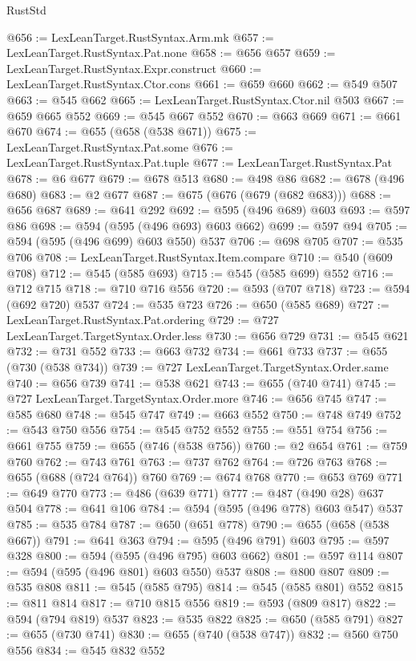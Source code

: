 \begin{lexlean}{RustStd}
\begin{coremodule}
@656 := LexLeanTarget.RustSyntax.Arm.mk
@657 := LexLeanTarget.RustSyntax.Pat.none
@658 := @656 @657
@659 := LexLeanTarget.RustSyntax.Expr.construct
@660 := LexLeanTarget.RustSyntax.Ctor.cons
@661 := @659 @660
@662 := @549 @507
@663 := @545 @662
@665 := LexLeanTarget.RustSyntax.Ctor.nil @503
@667 := @659 @665 @552
@669 := @545 @667 @552
@670 := @663 @669
@671 := @661 @670
@674 := @655 (@658 (@538 @671))
@675 := LexLeanTarget.RustSyntax.Pat.some
@676 := LexLeanTarget.RustSyntax.Pat.tuple
@677 := LexLeanTarget.RustSyntax.Pat
@678 := @6 @677
@679 := @678 @513
@680 := @498 @86
@682 := @678 (@496 @680)
@683 := @2 @677
@687 := @675 (@676 (@679 (@682 @683)))
@688 := @656 @687
@689 := @641 @292
@692 := @595 (@496 @689) @603
@693 := @597 @86
@698 := @594 (@595 (@496 @693) @603 @662)
@699 := @597 @94
@705 := @594 (@595 (@496 @699) @603 @550) @537
@706 := @698 @705
@707 := @535 @706
@708 := LexLeanTarget.RustSyntax.Item.compare
@710 := @540 (@609 @708)
@712 := @545 (@585 @693)
@715 := @545 (@585 @699) @552
@716 := @712 @715
@718 := @710 @716 @556
@720 := @593 (@707 @718)
@723 := @594 (@692 @720) @537
@724 := @535 @723
@726 := @650 (@585 @689)
@727 := LexLeanTarget.RustSyntax.Pat.ordering
@729 := @727 LexLeanTarget.TargetSyntax.Order.less
@730 := @656 @729
@731 := @545 @621
@732 := @731 @552
@733 := @663 @732
@734 := @661 @733
@737 := @655 (@730 (@538 @734))
@739 := @727 LexLeanTarget.TargetSyntax.Order.same
@740 := @656 @739
@741 := @538 @621
@743 := @655 (@740 @741)
@745 := @727 LexLeanTarget.TargetSyntax.Order.more
@746 := @656 @745
@747 := @585 @680
@748 := @545 @747
@749 := @663 @552
@750 := @748 @749
@752 := @543 @750 @556
@754 := @545 @752 @552
@755 := @551 @754
@756 := @661 @755
@759 := @655 (@746 (@538 @756))
@760 := @2 @654
@761 := @759 @760
@762 := @743 @761
@763 := @737 @762
@764 := @726 @763
@768 := @655 (@688 (@724 @764)) @760
@769 := @674 @768
@770 := @653 @769
@771 := @649 @770
@773 := @486 (@639 @771)
@777 := @487 (@490 @28) @637 @504
@778 := @641 @106
@784 := @594 (@595 (@496 @778) @603 @547) @537
@785 := @535 @784
@787 := @650 (@651 @778)
@790 := @655 (@658 (@538 @667))
@791 := @641 @363
@794 := @595 (@496 @791) @603
@795 := @597 @328
@800 := @594 (@595 (@496 @795) @603 @662)
@801 := @597 @114
@807 := @594 (@595 (@496 @801) @603 @550) @537
@808 := @800 @807
@809 := @535 @808
@811 := @545 (@585 @795)
@814 := @545 (@585 @801) @552
@815 := @811 @814
@817 := @710 @815 @556
@819 := @593 (@809 @817)
@822 := @594 (@794 @819) @537
@823 := @535 @822
@825 := @650 (@585 @791)
@827 := @655 (@730 @741)
@830 := @655 (@740 (@538 @747))
@832 := @560 @750 @556
@834 := @545 @832 @552

\end{coremodule}
\end{lexlean}
